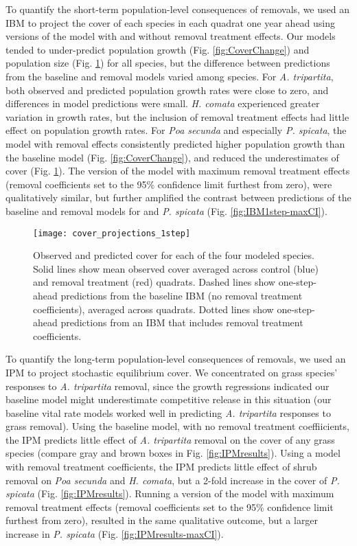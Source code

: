 \documentclass[11pt]{article}
\begin{document}
\begin{doublespacing}
To quantify the short-term population-level consequences of removals, we used an IBM to project the cover of each species in each quadrat one year ahead using versions of the model with and without removal treatment effects. Our models tended to under-predict population growth (Fig. \ref{fig:CoverChange}) and population size (Fig. \ref{fig:IBM1step}) for all species, but the difference between predictions from the baseline and removal models varied among species. For \textit{A. tripartita}, both observed and predicted population growth rates were close to zero, and differences in model predictions were small. \textit{H. comata} experienced greater variation in growth rates, but the inclusion of removal treatment effects had little effect on population growth rates. For \textit{Poa secunda} and especially \textit{P. spicata}, the model with removal effects consistently predicted higher population growth than the baseline model (Fig. \ref{fig:CoverChange}), and reduced the underestimates of cover (Fig. \ref{fig:IBM1step}). The version of the model with maximum removal treatment effects (removal coefficients set to the 95\% confidence limit furthest from zero), were qualitatively similar, but further amplified the contrast between predictions of the baseline and removal models for and \textit{P. spicata} (Fig. \ref{fig:IBM1step-maxCI}).

 \begin{figure}[tbp]
 \centering
 \texttt{[image: cover\_projections\_1step]}
 \caption{Observed and predicted cover for each of the four modeled species. Solid lines show mean observed cover averaged across control (blue) and removal treatment (red) quadrats. Dashed lines show one-step-ahead predictions from the baseline IBM (no removal treatment coefficients), averaged across quadrats. Dotted lines show one-step-ahead predictions from an IBM that includes removal treatment coefficients. }
 \label{fig:IBM1step}
 \end{figure}

To quantify the long-term population-level consequences of removals, we used an IPM to project stochastic equilibrium cover. We concentrated on grass species' responses to \textit{A. tripartita} removal, since the growth regressions indicated our baseline model might underestimate competitive release in this situation (our baseline vital rate models worked well in predicting \textit{A. tripartita} responses to grass removal). Using the baseline model, with no removal treatment coeffiicients, the IPM predicts little effect of \textit{A. tripartita} removal on the cover of any grass species (compare gray and brown boxes in Fig. \ref{fig:IPMresults}). Using a model with removal treatment coefficients, the IPM predicts little effect of shrub removal on \textit{Poa secunda} and \textit{H. comata}, but a 2-fold increase in the cover of \textit{P. spicata} (Fig. \ref{fig:IPMresults}). Running a version of the model with maximum removal treatment effects (removal coefficients set to the 95\% confidence limit furthest from zero), resulted in the same qualitative outcome, but a larger increase in \textit{P. spicata} (Fig. \ref{fig:IPMresults-maxCI}). 


\end{doublespacing}
\end{document}
